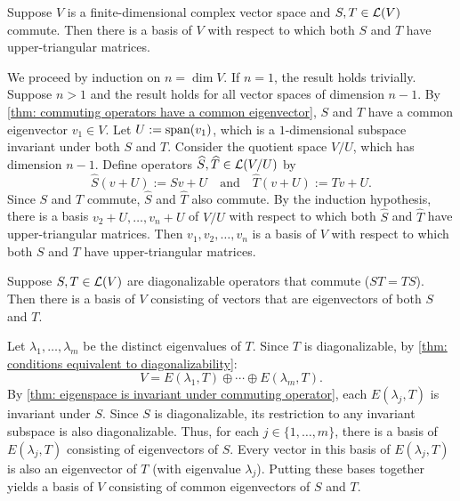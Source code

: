 \setcounter{thm}{73}
\begin{thm}
  \label{thm: simultaneous upper triangularization}
  Suppose $V$ is a finite-dimensional complex vector space and $S, T \in \mathcal{L}(V)$ commute. Then there is a basis of $V$ with respect to which both $S$ and $T$ have upper-triangular matrices.
\end{thm}
\begin{prf}
  We proceed by induction on $n = \dim V$. If $n = 1$, the result holds trivially.
  Suppose $n > 1$ and the result holds for all vector spaces of dimension $n-1$.
  By \ref{thm: commuting operators have a common eigenvector}, $S$ and $T$ have a common eigenvector $v_1 \in V$.
  Let $U := \operatorname{span} (v_1)$, which is a $1$-dimensional subspace invariant under both $S$ and $T$.
  Consider the quotient space $V/U$, which has dimension $n-1$.
  Define operators $\widehat{S}, \widehat{T} \in \mathcal{L}(V/U)$ by
  \begin{equation}
    \widehat{S}(v+U) := Sv + U \quad \text{and} \quad \widehat{T}(v+U) := Tv + U.
  \end{equation}
  Since $S$ and $T$ commute, $\widehat{S}$ and $\widehat{T}$ also commute.
  By the induction hypothesis, there is a basis $v_2+U, \dots, v_n+U$ of $V/U$ with respect to which both $\widehat{S}$ and $\widehat{T}$ have upper-triangular matrices.
  Then $v_1, v_2, \dots, v_n$ is a basis of $V$ with respect to which both $S$ and $T$ have upper-triangular matrices.
\end{prf}

\setcounter{thm}{75}
\begin{thm}
  \label{thm: simultaneous diagonalization}
  Suppose $S, T \in \mathcal{L}(V)$ are diagonalizable operators that commute ($ST=TS$). Then there is a basis of $V$ consisting of vectors that are eigenvectors of both $S$ and $T$.
\end{thm}
\begin{prf}
  Let $\lambda_1, \dots, \lambda_m$ be the distinct eigenvalues of $T$. Since $T$ is diagonalizable, by \ref{thm: conditions equivalent to diagonalizability}:
  \begin{equation}
    V = E(\lambda_1, T) \oplus \cdots \oplus E(\lambda_m, T).
  \end{equation}
  By \ref{thm: eigenspace is invariant under commuting operator}, each $E(\lambda_j, T)$ is invariant under $S$.
  Since $S$ is diagonalizable, its restriction to any invariant subspace is also diagonalizable.
  Thus, for each $j \in \{1, \dots, m\}$, there is a basis of $E(\lambda_j, T)$ consisting of eigenvectors of $S$.
  Every vector in this basis of $E(\lambda_j, T)$ is also an eigenvector of $T$ (with eigenvalue $\lambda_j$).
  Putting these bases together yields a basis of $V$ consisting of common eigenvectors of $S$ and $T$.
\end{prf}